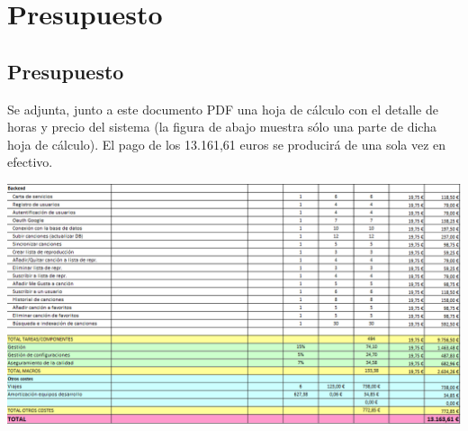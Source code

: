
\chapter{Presupuesto} %

\label{Chapter6} %


\section{Presupuesto}

Se adjunta, junto a este documento PDF una hoja de c\'alculo con el detalle de horas y precio del sistema (la figura de abajo muestra s\'olo una parte de dicha hoja de c\'alculo). El pago de los 13.161,61 euros se producir\'a de una sola vez en efectivo.

\includegraphics[width=\textwidth]{Figures/excel.png}